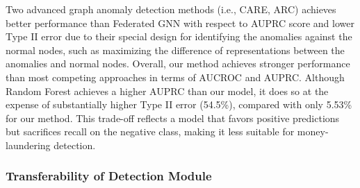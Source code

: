 Two advanced graph anomaly detection methods (i.e., CARE, ARC) achieves better performance than Federated GNN with respect to AUPRC score and lower Type II error due to their special design for identifying the anomalies against the normal nodes, such as maximizing the difference of representations between the anomalies and normal nodes. Overall, our method achieves stronger performance than most competing approaches in terms of AUCROC and AUPRC. Although Random Forest achieves a higher AUPRC than our model, it does so at the expense of substantially higher Type II error (54.5\%), compared with only 5.53\% for our method. This trade-off reflects a model that favors positive predictions but sacrifices recall on the negative class, making it less suitable for money-laundering detection.




\subsubsection{Transferability of Detection Module}


